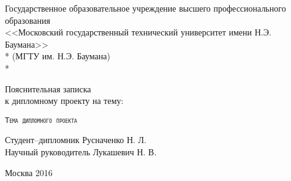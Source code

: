 \begin{titlepage}
\newpage

\begin{center}
Государственное образовательное учреждение высшего профессионального образования \\
\vspace{1cm}
\Large<<Московский государственный технический университет имени Н.Э. Баумана>> \\*
(МГТУ им. Н.Э. Баумана) \\*
\hrulefill
\end{center}


\vspace{1em}

\begin{center}
\Large Пояснительная записка \\ к дипломному проекту на тему:
\end{center}

\vspace{2.0em}

\begin{center}
	\Large
    \textsc{ \tt{Тема дипломного проекта}}
\end{center}

\vspace{6em}

\begin{flushleft}
Студент--дипломник \hrulefill \hspace{1pt} Русначенко Н. Л. \\
\vspace{1.5em}
Научный руководитель \hrulefill \hspace{1pt} Лукашевич Н. В.\\
\vspace{1.5em}
\end{flushleft}

\vspace{\fill}

\begin{center}
Москва 2016
\end{center}

\end{titlepage}
